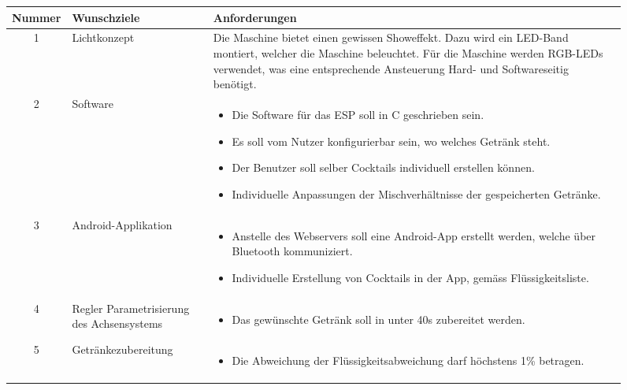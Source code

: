 \begin{figure}[H]
	\begin{flushleft}
		\small
		\begin{tabular}{|p{3cm}|p{3.25cm}|p{9.85cm}|}%
\hline
\multicolumn{1}{|l|}{\textbf{Nummer}} & \textbf{Wunschziele}  & \textbf{Anforderungen}                                                                                                                                         \\ \hline
		
\multicolumn{1}{|c|}{\cellcolor{green}1} & \cellcolor{green}Lichtkonzept & \cellcolor{green} Die Maschine bietet einen gewissen Showeffekt. Dazu wird ein LED-Band montiert, welcher die Maschine beleuchtet. Für die Maschine werden RGB-LEDs verwendet, was eine entsprechende Ansteuerung Hard- und Softwareseitig benötigt. \\ \hline

\multicolumn{1}{|c|}{\cellcolor{orange}2} & \cellcolor{orange}Software & \cellcolor{orange}
\begin{itemize}
\item Die Software für das ESP soll in C geschrieben sein. 
\item Es soll vom Nutzer konfigurierbar sein, wo welches Getränk steht.
\item Der Benutzer soll selber Cocktails individuell erstellen können.
\item Individuelle Anpassungen der Mischverhältnisse der gespeicherten Getränke.
\end{itemize} \\ \hline

\multicolumn{1}{|c|}{\cellcolor{green}3} & \cellcolor{green}Android-Applikation & \cellcolor{green}\begin{itemize}
\item Anstelle des Webservers soll eine Android-App erstellt werden, welche über Bluetooth kommuniziert.
\item Individuelle Erstellung von Cocktails in der App, gemäss Flüssigkeitsliste.
\end{itemize} \\ \hline
			
\multicolumn{1}{|c|}{\cellcolor{green}4} & \cellcolor{green}Regler Parametrisierung des Achsensystems & \cellcolor{green}\begin{itemize}
\item Das gewünschte Getränk soll in unter 40s zubereitet werden.
\end{itemize} \\ 
			\hline
			
			\multicolumn{1}{|c|}{\cellcolor{red}5} & \cellcolor{red}Getränkezubereitung& \cellcolor{red}\begin{itemize}
\item Die Abweichung der Flüssigkeitsabweichung darf höchstens 1\% betragen.
\end{itemize} \\ 
			\hline
		\end{tabular}
	\end{flushleft}

	\label{table:Wunschziele}
\end{figure}
\newpage
